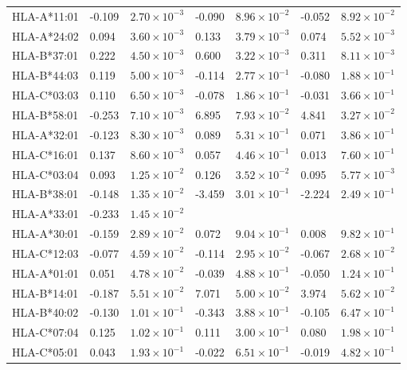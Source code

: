 \documentclass[]{article}
\begin{document}
\begin{doublespace}
\begin{longtable}[H]{p{3cm}p{1cm}p{2cm}p{1cm}p{2cm}p{1cm}p{2cm}}
		HLA-A*11:01 & -0.109 & $2.70 \times 10^{-3}$ & -0.090 & $8.96 \times 10^{-2}$ & -0.052 & $8.92 \times 10^{-2}$ \\ 
		HLA-A*24:02 & 0.094 & $3.60 \times 10^{-3}$ & 0.133 & $3.79 \times 10^{-3}$ & 0.074 & $5.52 \times 10^{-3}$ \\ 
		HLA-B*37:01 & 0.222 & $4.50 \times 10^{-3}$ & 0.600 & $3.22 \times 10^{-3}$ & 0.311 & $8.11 \times 10^{-3}$ \\ 
		HLA-B*44:03 & 0.119 & $5.00 \times 10^{-3}$ & -0.114 & $2.77 \times 10^{-1}$ & -0.080 & $1.88 \times 10^{-1}$ \\ 
		HLA-C*03:03 & 0.110 & $6.50 \times 10^{-3}$ & -0.078 & $1.86 \times 10^{-1}$ & -0.031 & $3.66 \times 10^{-1}$ \\ 
		HLA-B*58:01 & -0.253 & $7.10 \times 10^{-3}$ & 6.895 & $7.93 \times 10^{-2}$ & 4.841 & $3.27 \times 10^{-2}$ \\ 
		HLA-A*32:01 & -0.123 & $8.30 \times 10^{-3}$ & 0.089 & $5.31 \times 10^{-1}$ & 0.071 & $3.86 \times 10^{-1}$ \\ 
		HLA-C*16:01 & 0.137 & $8.60 \times 10^{-3}$ & 0.057 & $4.46 \times 10^{-1}$ & 0.013 & $7.60 \times 10^{-1}$ \\ 
		HLA-C*03:04 & 0.093 & $1.25 \times 10^{-2}$ & 0.126 & $3.52 \times 10^{-2}$ & 0.095 & $5.77 \times 10^{-3}$ \\ 
		HLA-B*38:01 & -0.148 & $1.35 \times 10^{-2}$ & -3.459 & $3.01 \times 10^{-1}$ & -2.224 & $2.49 \times 10^{-1}$ \\ 
		HLA-A*33:01 & -0.233 & $1.45 \times 10^{-2}$ &  &  &  &  \\ 
		HLA-A*30:01 & -0.159 & $2.89 \times 10^{-2}$ & 0.072 & $9.04 \times 10^{-1}$ & 0.008 & $9.82 \times 10^{-1}$ \\ 
		HLA-C*12:03 & -0.077 & $4.59 \times 10^{-2}$ & -0.114 & $2.95 \times 10^{-2}$ & -0.067 & $2.68 \times 10^{-2}$ \\ 
		HLA-A*01:01 & 0.051 & $4.78 \times 10^{-2}$ & -0.039 & $4.88 \times 10^{-1}$ & -0.050 & $1.24 \times 10^{-1}$ \\ 
		HLA-B*14:01 & -0.187 & $5.51 \times 10^{-2}$ & 7.071 & $5.00 \times 10^{-2}$ & 3.974 & $5.62 \times 10^{-2}$ \\ 
		HLA-B*40:02 & -0.130 & $1.01 \times 10^{-1}$ & -0.343 & $3.88 \times 10^{-1}$ & -0.105 & $6.47 \times 10^{-1}$ \\ 
		HLA-C*07:04 & 0.125 & $1.02 \times 10^{-1}$ & 0.111 & $3.00 \times 10^{-1}$ & 0.080 & $1.98 \times 10^{-1}$ \\ 
		HLA-C*05:01 & 0.043 & $1.93 \times 10^{-1}$ & -0.022 & $6.51 \times 10^{-1}$ & -0.019 & $4.82 \times 10^{-1}$ \\ 

\end{longtable}
\end{doublespace}
\end{document}
